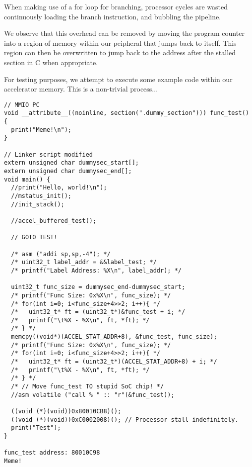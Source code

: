\documentclass[a4paper,8pt]{report}
\begin{document}
When making use of a for loop for branching, processor cycles are wasted
continuously loading the branch instruction, and bubbling the pipeline.

We observe that this overhead can be removed by moving the program counter into
a region of memory within our peipheral that jumps back to itself. This region
can then be overwritten to jump back to the address after the stalled section in
C when appropriate.

For testing purposes, we attempt to execute some example code within our
accelerator memory. This is a non-trivial process...
\begin{verbatim}
// MMIO PC
void __attribute__((noinline, section(".dummy_section"))) func_test() {
  print("Meme!\n");
}

// Linker script modified
extern unsigned char dummysec_start[];
extern unsigned char dummysec_end[];
void main() {
  //print("Hello, world!\n");
  //mstatus_init();
  //init_stack();

  //accel_buffered_test();

  // GOTO TEST!

  /* asm ("addi sp,sp,-4"); */
  /* uint32_t label_addr = &&label_test; */
  /* printf("Label Address: %X\n", label_addr); */

  uint32_t func_size = dummysec_end-dummysec_start;
  /* printf("Func Size: 0x%X\n", func_size); */
  /* for(int i=0; i<func_size+4>>2; i++){ */
  /*   uint32_t* ft = (uint32_t*)&func_test + i; */
  /*   printf("\t%X - %X\n", ft, *ft); */
  /* } */
  memcpy((void*)(ACCEL_STAT_ADDR+8), &func_test, func_size);
  /* printf("Func Size: 0x%X\n", func_size); */
  /* for(int i=0; i<func_size+4>>2; i++){ */
  /*   uint32_t* ft = (uint32_t*)(ACCEL_STAT_ADDR+8) + i; */
  /*   printf("\t%X - %X\n", ft, *ft); */
  /* } */
  /* // Move func_test TO stupid SoC chip! */
  //asm volatile ("call % " :: "r"(&func_test));

  ((void (*)(void))0x80010CB8)();
  ((void (*)(void))0xC0002008)(); // Processor stall indefinitely.
  print("Test");
}

func_test address: 80010C98
Meme!
\end{verbatim}








\subsection{}
\end{document}
